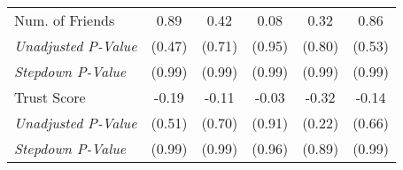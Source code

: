\begin{tabular}{l c c c c c}
Num. of Friends & 0.89 & 0.42 & 0.08 & 0.32 & 0.86 \\
\quad \textit{Unadjusted P-Value} & (0.47) & (0.71) & (0.95) & (0.80) & (0.53) \\
\quad \textit{Stepdown P-Value} & (0.99) & (0.99) & (0.99) & (0.99) & (0.99) \\
Trust Score & -0.19 & -0.11 & -0.03 & -0.32 & -0.14 \\
\quad \textit{Unadjusted P-Value} & (0.51) & (0.70) & (0.91) & (0.22) & (0.66) \\
\quad \textit{Stepdown P-Value} & (0.99) & (0.99) & (0.96) & (0.89) & (0.99) \\
\bottomrule
\end{tabular}
